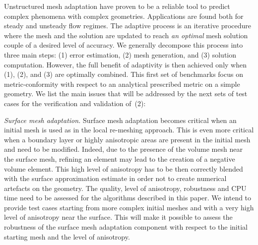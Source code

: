 \documentclass[3p,times,procedia,number]{elsarticle}
\begin{document}
Unstructured mesh adaptation have proven to be a reliable tool to predict complex phenomena  with complex geometries.\cite{alauzet-loseille-decade-aniso-adapt-cfd,michal-unstruct-adapt-epic-dpw6}
Applications are found both for steady and unsteady flow regimes. The adaptive process is an iterative procedure where  the mesh and
the solution are updated to reach {\it an optimal} mesh solution couple of a desired level of accuracy. We generally decompose this process
into three main steps:  (1) error estimation, (2) mesh generation, and (3) solution computation.
%
However, the full benefit of adaptivity is then achieved only when (1), (2), and (3) are optimally combined.
This first set of benchmarks focus on metric-conformity with respect to an analytical prescribed
metric on a simple geometry.
We list the main issues that will be addressed by the next sets of test cases  for the verification and validation of~(2):

\emph{Surface mesh adaptation.\;}
Surface mesh adaptation becomes critical when an initial mesh is used as in the local re-meshing approach.
This is even more critical when a boundary layer or highly anisotropic areas  are present in the initial mesh and need to be modified.
Indeed, due to the presence of the volume mesh near the surface mesh, refining an element may lead to the creation
of a negative volume element.  
This high level of anisotropy has to be then correctly blended
with the  surface approximation estimate in order not to create numerical artefacts on the geometry.
The quality, level of anisotropy, robustness and CPU time need to be assessed  for the  algorithms described in this paper.
We intend to provide test cases  starting from more complex initial meshes and with a very high level of anisotropy
near the surface. This will make it possible to assess the robustness of the surface mesh adaptation component with respect to the initial starting mesh
and the level of anisotropy.
\end{document}
